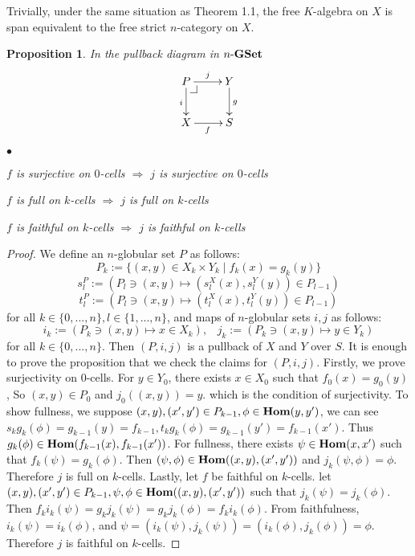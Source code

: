 \documentclass[12pt]{article}
\makeatletter
\theoremstyle{plain}
\newtheorem{proposition}[theorem]{Proposition}
\theoremstyle{definition}
\newcommand{\pullbackmark}[2]{\save ;p+<.8pc,0pc>:(0,-1)::%
(#1) *{\phantom{Z}} %
;p+(#2)-(0,0) **@{-}%
;p-(#1)+(0,0) *{\phantom{Z}} **@{-} \restore}
\makeatother
\begin{document}
Trivially, under the same situation as Theorem 1.1, the free $K$-algebra on $X$ is span equivalent to the free strict $n$-category on $X$. 

\begin{proposition}
In the pullback diagram in $n \mathchar`- {\bf GSet}$
\[ \xymatrix{
 P \pullbackmark{1,0}{0,1} \ar[r]^j \ar[d]_i & Y \ar[d]^g \\
 X \ar[r]_f & S
} \]
\begin{list}{$\bullet$}{}
\item $f$ is surjective on $0$-cells $\Rightarrow$ $j$ is surjective on $0$-cells
\item $f$ is full on $k$-cells $\Rightarrow$ $j$ is full on $k$-cells
\item $f$ is faithful on $k$-cells $\Rightarrow$ $j$ is faithful on $k$-cells
\end{list}
\end{proposition}

\begin{proof} We define an $n$-globular set $P$ as follows:
\[ P_k := \{ (x,y) \in X_k \times Y_k \mid f_k(x)=g_k(y) \}  \]
\[ s_l^P := ( P_l \ni (x,y) \mapsto (s_l^X (x), s_l^Y (y) ) \in P_{l-1} ) \]
\[ t_l^P := ( P_l \ni (x,y) \mapsto (t_l^X (x), t_l^Y (y) ) \in P_{l-1} ) \]
for all $k \in \{ 0,...,n \}, l \in \{ 1,...,n \}$, and maps of $n$-globular sets $i,j$ as follows:
\[
i_k := (P_k \ni (x,y) \mapsto x \in X_k), \hspace{10pt} j_k := (P_k \ni (x,y) \mapsto y \in Y_k)
\]
for all $k \in \{ 0,...,n \}$. Then $(P,i,j)$ is a pullback of $X$ and $Y$ over $S$. It is enough to prove the proposition that we check the claims for $(P,i,j)$.
Firstly, we prove surjectivity on $0$-cells. For $y \in Y_0$, there exists $x \in X_0$ such that $f_{0}(x)=g_{0}(y)$, So $(x,y) \in P_{0}$ and $j_{0}((x,y))=y$. which is the condition of surjectivity.
To show fullness, we suppose $(x,y), (x',y') \in P_{k-1}, \phi \in {\bf Hom}(y,y')$, we can see $s_{k} g_{k}(\phi)=g_{k-1}(y)=f_{k-1}, t_{k} g_{k} (\phi)=g_{k-1} (y')=f_{k-1} (x')$. Thus $g_{k} (\phi) \in {\bf Hom}(f_{k-1}(x), f_{k-1}(x'))$. For fullness, there exists $\psi \in {\bf Hom}(x,x')$ such that $f_k (\psi) = g_k (\phi)$. Then $(\psi , \phi ) \in {\bf Hom}((x,y),(x',y'))$ and $j_k (\psi ,\phi ) =\phi$. Therefore $j$ is full on $k$-cells. 
Lastly, let $f$ be faithful on $k$-cells. let $(x,y), (x',y') \in P_{k-1}, \psi, \phi \in {\bf Hom}((x,y), (x', y'))$ such that $j_{k}(\psi)=j_{k}(\phi)$. Then $f_k i_k(\psi)=g_k j_k (\psi)=g_k j_k (\phi)=f_k i_k(\phi)$. From faithfulness, $i_k (\psi)= i_k (\phi)$, and $\psi = (i_k (\psi ), j_k (\psi ))=(i_k (\phi ), j_k (\phi ))=\phi $. Therefore $j$ is faithful on $k$-cells.
\end{proof}
\end{document}
